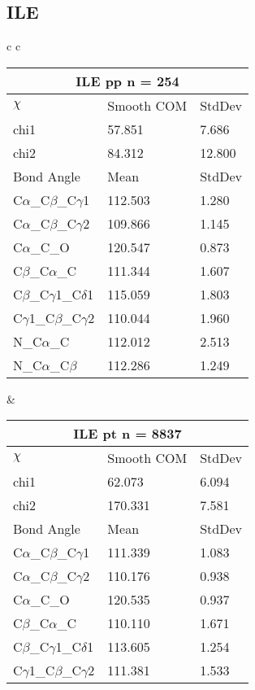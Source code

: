 \newpage
\subsection{ILE}

\begin{longtable}{ c c }

  \begin{tabular}{ l l l }
  \toprule
  \multicolumn{3}{c}{ILE \textbf{pp} n = 254} \\ \toprule
  $\chi$       & Smooth COM & StdDev \\ \midrule
  chi1 & 57.851 & 7.686 \\ 
  chi2 & 84.312 & 12.800 \\ \midrule
  Bond Angle   & Mean     & StdDev \\ \midrule
  C$\alpha$\_C$\beta$\_C$\gamma$1 & 112.503 & 1.280\\
  C$\alpha$\_C$\beta$\_C$\gamma$2 & 109.866 & 1.145\\
  C$\alpha$\_C\_O & 120.547 & 0.873\\
  C$\beta$\_C$\alpha$\_C & 111.344 & 1.607\\
  C$\beta$\_C$\gamma$1\_C$\delta$1 & 115.059 & 1.803\\
  C$\gamma$1\_C$\beta$\_C$\gamma$2 & 110.044 & 1.960\\
  N\_C$\alpha$\_C & 112.012 & 2.513\\
  N\_C$\alpha$\_C$\beta$ & 112.286 & 1.249\\
  \bottomrule
  \end{tabular}
  &
  \begin{tabular}{ l l l }
  \toprule
  \multicolumn{3}{c}{ILE \textbf{pt} n = 8837} \\ \toprule
  $\chi$       & Smooth COM & StdDev \\ \midrule
  chi1 & 62.073 & 6.094 \\ 
  chi2 & 170.331 & 7.581 \\ \midrule
  Bond Angle   & Mean     & StdDev \\ \midrule
  C$\alpha$\_C$\beta$\_C$\gamma$1 & 111.339 & 1.083\\
  C$\alpha$\_C$\beta$\_C$\gamma$2 & 110.176 & 0.938\\
  C$\alpha$\_C\_O & 120.535 & 0.937\\
  C$\beta$\_C$\alpha$\_C & 110.110 & 1.671\\
  C$\beta$\_C$\gamma$1\_C$\delta$1 & 113.605 & 1.254\\
  C$\gamma$1\_C$\beta$\_C$\gamma$2 & 111.381 & 1.533\\

\end{tabular}
\end{longtable}
